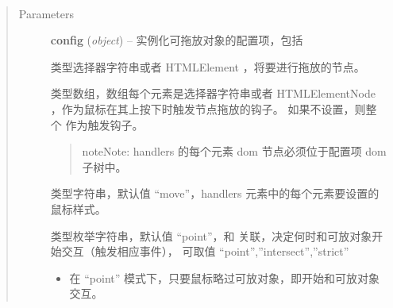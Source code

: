 \documentclass[letterpaper,10pt,english]{sphinxmanual}
\begin{document}
\begin{fulllineitems}
\label{api/component/dd/draggable:DD.Draggable}~\begin{quote}\begin{description}
\item[{Parameters}] \leavevmode
\textbf{config} (\emph{object}) --
实例化可拖放对象的配置项，包括


\begin{fulllineitems}
\label{api/component/dd/draggable:DD.Draggable.config.node}
类型选择器字符串或者 HTMLElement ，将要进行拖放的节点。

\end{fulllineitems}



\begin{fulllineitems}
\label{api/component/dd/draggable:DD.Draggable.config.handlers}
类型数组，数组每个元素是选择器字符串或者 HTMLElementNode ，作为鼠标在其上按下时触发节点拖放的钩子。
如果不设置，则整个  作为触发钩子。
\begin{quote}

\begin{notice}{note}{Note:}
handlers 的每个元素 dom 节点必须位于配置项  dom 子树中。
\end{notice}
\end{quote}

\end{fulllineitems}



\begin{fulllineitems}
\label{api/component/dd/draggable:DD.Draggable.config.cursor}
类型字符串，默认值 ``move''，handlers 元素中的每个元素要设置的鼠标样式。

\end{fulllineitems}



\begin{fulllineitems}
\label{api/component/dd/draggable:DD.Draggable.config.mode}
类型枚举字符串，默认值 ``point''，和  关联，决定何时和可放对象开始交互（触发相应事件），
可取值 ``point'',''intersect'',''strict''
\begin{itemize}
\item {}
在 ``point'' 模式下，只要鼠标略过可放对象，即开始和可放对象交互。


\end{itemize}
\end{fulllineitems}
\end{description}
\end{quote}
\end{fulllineitems}
\end{document}

